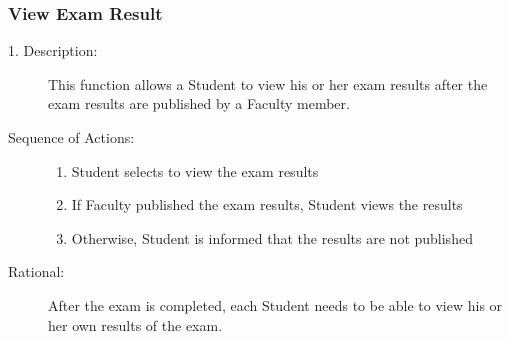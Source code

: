    \subsubsection{\large View Exam Result} 
   \begin{boxed} %
      \begin{description}
         \item[1. Description:\label{desc:student_view}]
      This function allows a Student to view his or her exam results after
      the exam results are published by a Faculty member.
         
            \item[Sequence of Actions:]\hspace{10cm}
         \begin{enumerate}
            \item Student selects to view the exam results
            \item If Faculty published the exam results, Student views the
               results
            \item Otherwise, Student is informed that the results are not
               published
         \end{enumerate}

            \item[Rational:]
         After the exam is completed, each Student needs to be able to view his
         or her own results of the exam.
      \end{description}
   \end{boxed} %

